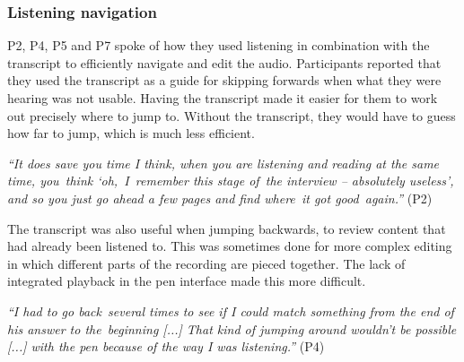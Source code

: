 


\subsubsection{Listening navigation}

P2, P4, P5 and P7 spoke of how they used listening in combination with the transcript to efficiently navigate and edit
the audio. Participants reported that they used the transcript as a guide for skipping forwards when what they were
hearing was not usable. Having the transcript made it easier for them to work out precisely where to jump to. Without
the transcript, they would have to guess how far to jump, which is much less efficient.

\textit{``It does save you time I think, when you are listening and reading at the same time, you think
  `oh, I remember this stage of the interview -- absolutely useless', and so you just go ahead a few pages and
find where it got good again.''} (P2)

The transcript was also useful when jumping backwards, to review content that had already been listened to. This was
sometimes done for more complex editing in which different parts of the recording are pieced together. 
The lack of integrated playback in the pen interface made this more difficult.

\textit{``I had to go back several times to see if I could match something from the end of his answer to the beginning [...]
  That kind of jumping around wouldn't be possible [...]
with the pen because of the way I was listening.''} (P4)


